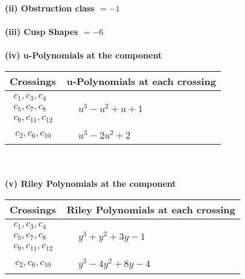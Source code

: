 \documentclass[1p]{elsarticle_modified}
\theoremstyle{definition}
\begin{document}
\flushleft \textbf{(ii) Obstruction class $= -1$}\\~\\
\flushleft \textbf{(iii) Cusp Shapes $= -6$}\\~\\
\newpage\renewcommand{\arraystretch}{1}
\flushleft \textbf{(iv) u-Polynomials at the component}\newline \\
\begin{tabular}{m{50pt}|m{274pt}}
Crossings & \hspace{64pt}u-Polynomials at each crossing \\
\hline $$\begin{aligned}c_{1},c_{3},c_{4}\\c_{5},c_{7},c_{8}\\c_{9},c_{11},c_{12}\end{aligned}$$&$\begin{aligned}
&u^3- u^2+u+1
\end{aligned}$\\
\hline $$\begin{aligned}c_{2},c_{6},c_{10}\end{aligned}$$&$\begin{aligned}
&u^3-2 u^2+2
\end{aligned}$\\
\hline
\end{tabular}\\~\\
\newpage\renewcommand{\arraystretch}{1}
\flushleft \textbf{(v) Riley Polynomials at the component}\newline \\
\begin{tabular}{m{50pt}|m{274pt}}
Crossings & \hspace{64pt}Riley Polynomials at each crossing \\
\hline $$\begin{aligned}c_{1},c_{3},c_{4}\\c_{5},c_{7},c_{8}\\c_{9},c_{11},c_{12}\end{aligned}$$&$\begin{aligned}
&y^3+y^2+3 y-1
\end{aligned}$\\
\hline $$\begin{aligned}c_{2},c_{6},c_{10}\end{aligned}$$&$\begin{aligned}
&y^3-4 y^2+8 y-4
\end{aligned}$\\
\hline
\end{tabular}\\~\\
\end{document}
